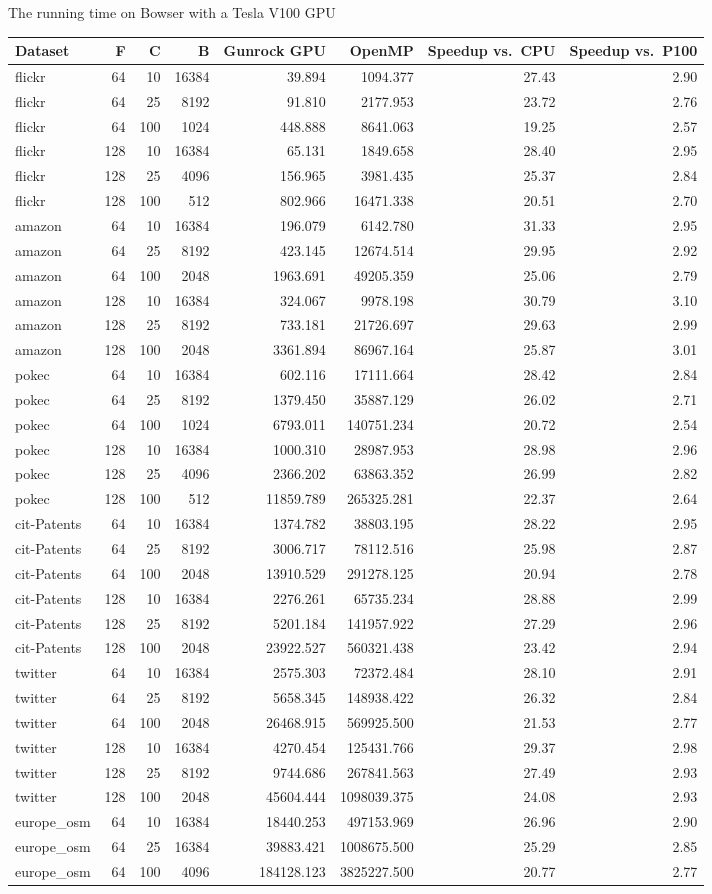 \documentclass[10pt,oneside]{memoir}
\begin{document}
The running time on Bowser with a Tesla V100 GPU

\begin{longtable}[]{@{}lrrrrrrr@{}}
\toprule
Dataset & F & C & B & Gunrock GPU & OpenMP & Speedup vs.~CPU & Speedup
vs.~P100\tabularnewline
\midrule
\endhead
flickr & 64 & 10 & 16384 & 39.894 & 1094.377 & 27.43 &
2.90\tabularnewline
flickr & 64 & 25 & 8192 & 91.810 & 2177.953 & 23.72 &
2.76\tabularnewline
flickr & 64 & 100 & 1024 & 448.888 & 8641.063 & 19.25 &
2.57\tabularnewline
flickr & 128 & 10 & 16384 & 65.131 & 1849.658 & 28.40 &
2.95\tabularnewline
flickr & 128 & 25 & 4096 & 156.965 & 3981.435 & 25.37 &
2.84\tabularnewline
flickr & 128 & 100 & 512 & 802.966 & 16471.338 & 20.51 &
2.70\tabularnewline
amazon & 64 & 10 & 16384 & 196.079 & 6142.780 & 31.33 &
2.95\tabularnewline
amazon & 64 & 25 & 8192 & 423.145 & 12674.514 & 29.95 &
2.92\tabularnewline
amazon & 64 & 100 & 2048 & 1963.691 & 49205.359 & 25.06 &
2.79\tabularnewline
amazon & 128 & 10 & 16384 & 324.067 & 9978.198 & 30.79 &
3.10\tabularnewline
amazon & 128 & 25 & 8192 & 733.181 & 21726.697 & 29.63 &
2.99\tabularnewline
amazon & 128 & 100 & 2048 & 3361.894 & 86967.164 & 25.87 &
3.01\tabularnewline
pokec & 64 & 10 & 16384 & 602.116 & 17111.664 & 28.42 &
2.84\tabularnewline
pokec & 64 & 25 & 8192 & 1379.450 & 35887.129 & 26.02 &
2.71\tabularnewline
pokec & 64 & 100 & 1024 & 6793.011 & 140751.234 & 20.72 &
2.54\tabularnewline
pokec & 128 & 10 & 16384 & 1000.310 & 28987.953 & 28.98 &
2.96\tabularnewline
pokec & 128 & 25 & 4096 & 2366.202 & 63863.352 & 26.99 &
2.82\tabularnewline
pokec & 128 & 100 & 512 & 11859.789 & 265325.281 & 22.37 &
2.64\tabularnewline
cit-Patents & 64 & 10 & 16384 & 1374.782 & 38803.195 & 28.22 &
2.95\tabularnewline
cit-Patents & 64 & 25 & 8192 & 3006.717 & 78112.516 & 25.98 &
2.87\tabularnewline
cit-Patents & 64 & 100 & 2048 & 13910.529 & 291278.125 & 20.94 &
2.78\tabularnewline
cit-Patents & 128 & 10 & 16384 & 2276.261 & 65735.234 & 28.88 &
2.99\tabularnewline
cit-Patents & 128 & 25 & 8192 & 5201.184 & 141957.922 & 27.29 &
2.96\tabularnewline
cit-Patents & 128 & 100 & 2048 & 23922.527 & 560321.438 & 23.42 &
2.94\tabularnewline
twitter & 64 & 10 & 16384 & 2575.303 & 72372.484 & 28.10 &
2.91\tabularnewline
twitter & 64 & 25 & 8192 & 5658.345 & 148938.422 & 26.32 &
2.84\tabularnewline
twitter & 64 & 100 & 2048 & 26468.915 & 569925.500 & 21.53 &
2.77\tabularnewline
twitter & 128 & 10 & 16384 & 4270.454 & 125431.766 & 29.37 &
2.98\tabularnewline
twitter & 128 & 25 & 8192 & 9744.686 & 267841.563 & 27.49 &
2.93\tabularnewline
twitter & 128 & 100 & 2048 & 45604.444 & 1098039.375 & 24.08 &
2.93\tabularnewline
europe\_osm & 64 & 10 & 16384 & 18440.253 & 497153.969 & 26.96 &
2.90\tabularnewline
europe\_osm & 64 & 25 & 16384 & 39883.421 & 1008675.500 & 25.29 &
2.85\tabularnewline
europe\_osm & 64 & 100 & 4096 & 184128.123 & 3825227.500 & 20.77 &
2.77\tabularnewline
\bottomrule
\end{longtable}
\end{document}
